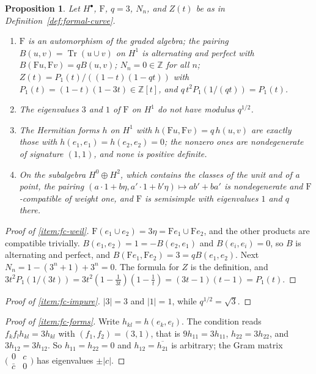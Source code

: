 \documentclass[11pt]{amsart}
\theoremstyle{plain}
\newtheorem{proposition}[theorem]{Proposition}
\theoremstyle{definition}
\theoremstyle{remark}
\numberwithin{equation}{section}
\newcommand{\Z}{\mathbb{Z}}
\DeclareMathOperator{\Tr}{Tr}
\begin{document}
\begin{proposition}\label{prop:formal-curve}
Let $H^\bullet$, $\mathrm{F}$, $q=3$, $N_n$, and $Z(t)$ be as in
Definition~\ref{def:formal-curve}.
\begin{enumerate}[label=(\roman*)]
\item\label{item:fc-weil} $\mathrm{F}$ is an automorphism of the graded
  algebra; the pairing $B(u,v)=\Tr(u\cup v)$ on $H^1$ is alternating
  and perfect with $B(\mathrm{F}u,\mathrm{F}v)=qB(u,v)$; $N_n=0\in\Z$
  for all $n$; $Z(t)=P_1(t)/((1-t)(1-qt))$ with $P_1(t)=(1-t)(1-3t)
  \in\Z[t]$, and $q\,t^2P_1(1/(qt))=P_1(t)$.
\item\label{item:fc-impure} The eigenvalues $3$ and $1$ of $\mathrm{F}$
  on $H^1$ do not have modulus $q^{1/2}$.
\item\label{item:fc-forms} The Hermitian forms $h$ on $H^1$ with
  $h(\mathrm{F}u,\mathrm{F}v)=q\,h(u,v)$ are exactly those with
  $h(e_1,e_1)=h(e_2,e_2)=0$; the nonzero ones are nondegenerate of
  signature $(1,1)$, and none is positive definite.
\item\label{item:fc-alg} On the subalgebra $H^0\oplus H^2$, which
  contains the classes of the unit and of a point, the pairing
  $(a\cdot1+b\eta,a'\cdot1+b'\eta)\mapsto ab'+ba'$ is nondegenerate and
  $\mathrm{F}$-compatible of weight one, and $\mathrm{F}$ is semisimple
  with eigenvalues $1$ and $q$ there.
\end{enumerate}
\end{proposition}

\begin{proof}[Proof of \ref{item:fc-weil}]
$\mathrm{F}(e_1\cup e_2)=3\eta=\mathrm{F}e_1\cup\mathrm{F}e_2$, and the
other products are compatible trivially. $B(e_1,e_2)=1=-B(e_2,e_1)$ and
$B(e_i,e_i)=0$, so $B$ is alternating and perfect, and
$B(\mathrm{F}e_1,\mathrm{F}e_2)=3=qB(e_1,e_2)$. Next
$N_n=1-(3^n+1)+3^n=0$. The formula for $Z$ is the definition, and
$3t^2P_1(1/(3t))=3t^2(1-\tfrac1{3t})(1-\tfrac1t)=(3t-1)(t-1)=P_1(t)$.
\end{proof}

\begin{proof}[Proof of \ref{item:fc-impure}]
$|3|=3$ and $|1|=1$, while $q^{1/2}=\sqrt3$.
\end{proof}

\begin{proof}[Proof of \ref{item:fc-forms}]
Write $h_{kl}=h(e_k,e_l)$. The condition reads
$f_kf_lh_{kl}=3h_{kl}$ with $(f_1,f_2)=(3,1)$, that is $9h_{11}=3h_{11}$,
$h_{22}=3h_{22}$, and $3h_{12}=3h_{12}$. So $h_{11}=h_{22}=0$ and
$h_{12}=\overline{h_{21}}$ is arbitrary; the Gram matrix
$\bigl(\begin{smallmatrix}0&c\\\bar c&0\end{smallmatrix}\bigr)$ has
eigenvalues $\pm|c|$.
\end{proof}
\end{document}
